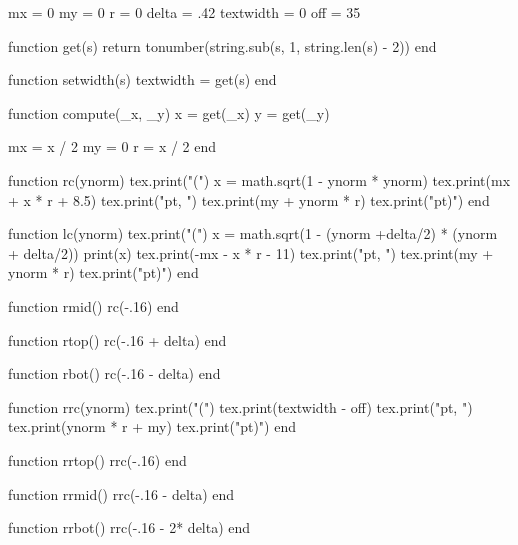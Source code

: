 \basicheader
\usepackage{ifthen,etoolbox}
\usepackage{colortbl}
\usepackage{longtable}
\usepackage{luacode}
\usepackage{xstring}

\begin{luacode}
    mx = 0
    my = 0
    r = 0
    delta = .42
    textwidth = 0
    off = 35

    function get(s)
        return tonumber(string.sub(s, 1, string.len(s) - 2))
    end

    function setwidth(s)
        textwidth = get(s)
    end

    function compute(_x, _y)
        x = get(_x)
        y = get(_y)

        mx = x / 2
        my = 0
        r = x / 2
    end

    function rc(ynorm)
        tex.print("(")
        x = math.sqrt(1 - ynorm * ynorm)
        tex.print(mx + x * r + 8.5)
        tex.print("pt, ")
        tex.print(my + ynorm * r)
        tex.print("pt)")
    end

    function lc(ynorm)
        tex.print("(")
        x = math.sqrt(1 - (ynorm  +delta/2) * (ynorm + delta/2))
        print(x)
        tex.print(-mx - x * r - 11)
        tex.print("pt, ")
        tex.print(my + ynorm * r)
        tex.print("pt)")
    end

    function rmid()
        rc(-.16)
    end

    function rtop()
        rc(-.16 + delta)
    end

    function rbot()
        rc(-.16 - delta)
    end

    function rrc(ynorm)
        tex.print("(")
        tex.print(textwidth - off)
        tex.print("pt, ")
        tex.print(ynorm * r + my)
        tex.print("pt)")
    end

    function rrtop()
        rrc(-.16)
    end

    function rrmid()
        rrc(-.16 - delta)
    end

    function rrbot()
        rrc(-.16 - 2* delta)
    end
\end{luacode}

\setlength{\LTpost}{\medskipamount}

\usepackage[lining,scaled=.9]{FiraMono}
\usepackage[mathrm=sym]{unicode-math}
\usepackage[Scale=.9]{firamath-otf}
\usepackage{luatexbase}
\usepackage{microtype}
\usepackage[hang,symbol,multiple]{footmisc}
\usepackage{tikz}
\usepackage{siunitx}
\usepackage{xcolor}

